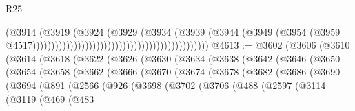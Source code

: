 \begin{lexlean}{R25}
\begin{coremodule}
                                                                              (@3914
                                                                                (@3919
                                                                                  (@3924
                                                                                    (@3929
                                                                                      (@3934
                                                                                        (@3939
                                                                                          (@3944
                                                                                            (@3949
                                                                                              (@3954
                                                                                                (@3959
                                                                                                  @4517)))))))))))))))))))))))))))))))))))))))))))))))
@4613 := @3602
    (@3606
      (@3610
        (@3614
          (@3618
            (@3622
              (@3626
                (@3630
                  (@3634
                    (@3638
                      (@3642
                        (@3646
                          (@3650
                            (@3654
                              (@3658
                                (@3662
                                  (@3666
                                    (@3670
                                      (@3674
                                        (@3678
                                          (@3682
                                            (@3686
                                              (@3690
                                                (@3694
                                                  (@891
                                                    (@2566
                                                      (@926
                                                        (@3698
                                                          (@3702
                                                            (@3706
                                                              (@488
                                                                (@2597
                                                                  (@3114
                                                                    (@3119
                                                                      (@469
                                                                        (@483

\end{coremodule}
\end{lexlean}
